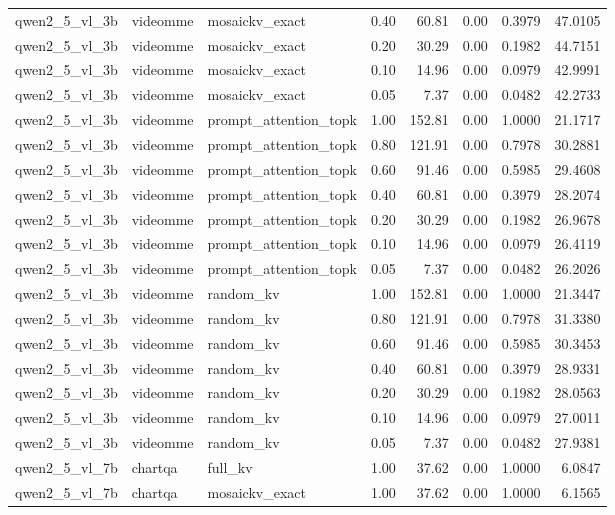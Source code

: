 \begin{longtable}{lllrrrrr}
qwen2\_5\_vl\_3b & videomme & mosaickv\_exact & 0.40 & 60.81 & 0.00 & 0.3979 & 47.0105 \\
qwen2\_5\_vl\_3b & videomme & mosaickv\_exact & 0.20 & 30.29 & 0.00 & 0.1982 & 44.7151 \\
qwen2\_5\_vl\_3b & videomme & mosaickv\_exact & 0.10 & 14.96 & 0.00 & 0.0979 & 42.9991 \\
qwen2\_5\_vl\_3b & videomme & mosaickv\_exact & 0.05 & 7.37 & 0.00 & 0.0482 & 42.2733 \\
qwen2\_5\_vl\_3b & videomme & prompt\_attention\_topk & 1.00 & 152.81 & 0.00 & 1.0000 & 21.1717 \\
qwen2\_5\_vl\_3b & videomme & prompt\_attention\_topk & 0.80 & 121.91 & 0.00 & 0.7978 & 30.2881 \\
qwen2\_5\_vl\_3b & videomme & prompt\_attention\_topk & 0.60 & 91.46 & 0.00 & 0.5985 & 29.4608 \\
qwen2\_5\_vl\_3b & videomme & prompt\_attention\_topk & 0.40 & 60.81 & 0.00 & 0.3979 & 28.2074 \\
qwen2\_5\_vl\_3b & videomme & prompt\_attention\_topk & 0.20 & 30.29 & 0.00 & 0.1982 & 26.9678 \\
qwen2\_5\_vl\_3b & videomme & prompt\_attention\_topk & 0.10 & 14.96 & 0.00 & 0.0979 & 26.4119 \\
qwen2\_5\_vl\_3b & videomme & prompt\_attention\_topk & 0.05 & 7.37 & 0.00 & 0.0482 & 26.2026 \\
qwen2\_5\_vl\_3b & videomme & random\_kv & 1.00 & 152.81 & 0.00 & 1.0000 & 21.3447 \\
qwen2\_5\_vl\_3b & videomme & random\_kv & 0.80 & 121.91 & 0.00 & 0.7978 & 31.3380 \\
qwen2\_5\_vl\_3b & videomme & random\_kv & 0.60 & 91.46 & 0.00 & 0.5985 & 30.3453 \\
qwen2\_5\_vl\_3b & videomme & random\_kv & 0.40 & 60.81 & 0.00 & 0.3979 & 28.9331 \\
qwen2\_5\_vl\_3b & videomme & random\_kv & 0.20 & 30.29 & 0.00 & 0.1982 & 28.0563 \\
qwen2\_5\_vl\_3b & videomme & random\_kv & 0.10 & 14.96 & 0.00 & 0.0979 & 27.0011 \\
qwen2\_5\_vl\_3b & videomme & random\_kv & 0.05 & 7.37 & 0.00 & 0.0482 & 27.9381 \\
qwen2\_5\_vl\_7b & chartqa & full\_kv & 1.00 & 37.62 & 0.00 & 1.0000 & 6.0847 \\
qwen2\_5\_vl\_7b & chartqa & mosaickv\_exact & 1.00 & 37.62 & 0.00 & 1.0000 & 6.1565 \\

\end{longtable}
